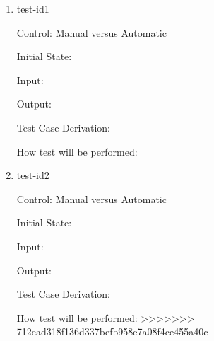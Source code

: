 \documentclass[12pt, titlepage]{article}
\begin{document}
\begin{enumerate}

\item{test-id1\\}

Control: Manual versus Automatic
					
Initial State: 
					
Input: 
					
Output: 

Test Case Derivation: 
					
How test will be performed: 
					
\item{test-id2\\}

Control: Manual versus Automatic
					
Initial State: 
					
Input: 
					
Output: 

Test Case Derivation: 

How test will be performed: 
>>>>>>> 712ead318f136d337befb958e7a08f4ce455a40c


\end{enumerate}
\end{document}

